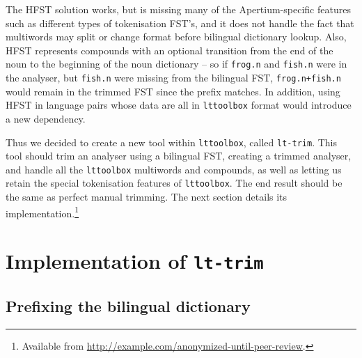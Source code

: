 \documentclass[10pt, a4paper]{article}
\newcommand{\ana}[1]{\texttt{#1}}
\newcommand{\tool}[1]{\texttt{#1}}
\begin{document}
The HFST solution works, but is missing many of the Apertium-specific
features such as different types of tokenisation FST's, and it does
not handle the fact that multiwords may split or change format before
bilingual dictionary lookup. Also, HFST represents compounds with an
optional transition from the end of the noun to the beginning of the
noun dictionary -- so if \ana{frog.n} and \ana{fish.n} were in the
analyser, but \ana{fish.n} were missing from the bilingual FST,
\ana{frog.n+fish.n} would remain in the trimmed FST since the prefix
matches. In addition, using HFST in language pairs whose data are all
in \tool{lttoolbox} format would introduce a new dependency.

Thus we decided to create a new tool within \tool{lttoolbox}, called
\tool{lt-trim}. This tool should trim an analyser using a bilingual
FST, creating a trimmed analyser, and handle all the \tool{lttoolbox}
multiwords and compounds, as well as letting us retain the special
tokenisation features of \tool{lttoolbox}. The end result should be
the same as perfect manual trimming. The next section details its
implementation.\footnote{Available from
  \href{http://example.com/anonymized-until-peer-review}{http://example.com/anonymized-until-peer-review}.}


\section{Implementation of \tool{lt-trim}}

\subsection{Prefixing the bilingual dictionary}
\end{document}
